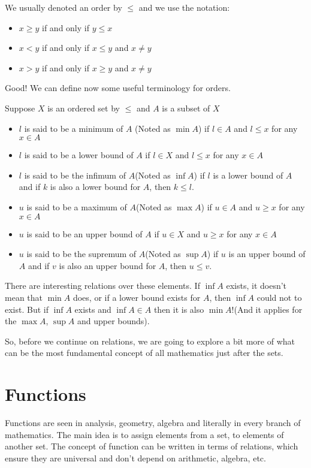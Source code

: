 \documentclass{tufte-handout}
\begin{document}
We usually denoted an order by $\le$ and we use the notation:
\begin{itemize}
	\item $x \ge y$ if and only if $y \le x$
	\item $x < y$ if and only if $x \le y$ and $x \neq y$
	\item $x > y$ if and only if $x \ge y$ and $x \neq y$
\end{itemize}

Good! We can define now some useful terminology for orders.
\begin{definition}
	Suppose $X$ is an ordered set by $\le$ and $A$ is a subset of $X$
	\begin{itemize}
		\item $l$ is said to be a minimum of $A$ (Noted as $\min A$) if $l \in A$ and $l \le x$ for any $x \in A$
		\item $l$ is said to be a lower bound of $A$ if $l \in X$ and $l \le x$ for any $x \in A$
		\item $l$ is said to be the infimum of $A$(Noted as $\inf A$) if $l$ is a lower bound of $A$ and if $k$ is also a lower bound for $A$, then $k \le l$.
		\item $u$ is said to be a maximum of $A$(Noted as $\max A$) if $u \in A$ and $u \ge x$ for any $x \in A$
		\item $u$ is said to be an upper bound of $A$ if $u \in X$ and $u \ge x$ for any $x \in A$
		\item $u$ is said to be the supremum of $A$(Noted as $\sup A$) if $u$ is an upper bound of $A$ and if $v$ is also an upper bound for $A$, then $u \le v$.
	\end{itemize}
\end{definition}

There are interesting relations over these elements. If $\inf A$ exists, it doesn't mean that $\min A$ does, or if a lower bound exists for $A$, then $\inf A$ could not to exist. But if $\inf A$ exists and $\inf A \in A$ then it is also $\min A$!(And it applies for the $\max A$, $\sup A$ and upper bounds).

So, before we continue on relations, we are going to explore a bit more of what can be the most fundamental concept of all mathematics just after the sets.

\section{Functions}
Functions are seen in analysis, geometry, algebra and literally in every branch of mathematics. The main idea is to assign elements from a set, to elements of another set. The concept of function can be written in terms of relations, which ensure they are universal and don't depend on arithmetic, algebra, etc.
\end{document}
